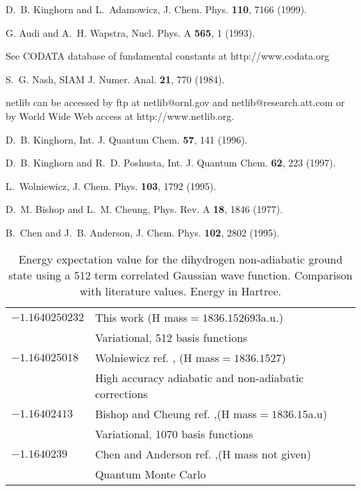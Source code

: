 \begin{references}

D.~B. Kinghorn and L.~Adamowicz,
\newblock J. Chem. Phys. {\bf 110}, 7166 (1999).

G. Audi and A.~H. Wapstra, Nucl. Phys. A {\bf 565},  1  (1993).

See CODATA database of fundamental constants at http://www.codata.org

S.~G. Nash,
\newblock SIAM J. Numer. Anal. {\bf 21}, 770 (1984).

netlib can be accessed by ftp at netlib@ornl.gov and 
netlib@research.att.com or by World Wide Web access at http://www.netlib.org.

D.~B. Kinghorn,
\newblock Int. J. Quantum Chem. {\bf 57}, 141 (1996).

D.~B. Kinghorn and R.~D. Poshusta,
\newblock Int. J. Quantum Chem. {\bf 62}, 223 (1997).

L.~Wolniewicz,
\newblock J. Chem. Phys. {\bf 103}, 1792 (1995).

D.~M. Bishop and L.~M. Cheung,
\newblock Phys. Rev. A {\bf 18}, 1846 (1977).

B.~Chen and J.~B. Anderson,
\newblock J. Chem. Phys. {\bf 102}, 2802 (1995).


\end{references}

\newpage
\mediumtext

\begin{table}[!pth]
\caption{Energy expectation value for the dihydrogen non-adiabatic ground state
         using a 512 term correlated {G}aussian wave function. Comparison
         with literature values. Energy in Hartree. 
\label{results}}

\begin{tabular}{ll}
 $-1.1640250232$ & This work (H mass$=1836.152693$a.u.)\\
                 & Variational, 512 basis functions \\ 

 $-1.164025018$ &
        Wolniewicz ref. \cite{Wolniewicz95}, (H mass$=1836.1527$)\\
        & High accuracy adiabatic and non-adiabatic corrections\\

 $-1.16402413$ &
        Bishop and Cheung ref. \cite{Bishop77b},(H mass$=1836.15$a.u)\\ 
        &Variational, 1070 basis functions \\
 
 $-1.1640239$ &
        Chen and Anderson ref. \cite{Chen95},(H mass not given)\\
        &Quantum Monte Carlo \\
\end{tabular}
\end{table}

